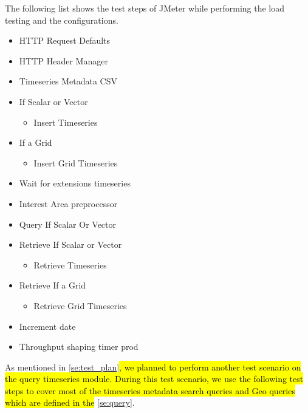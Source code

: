 The following list shows the test steps of  JMeter while performing the load testing and the configurations.

\begin{itemize}
    \item HTTP Request Defaults
    \item HTTP Header Manager
    \item Timeseries Metadata CSV
    \item If Scalar or Vector
        \begin{itemize}
            \item Insert Timeseries
        \end{itemize}
    \item If a Grid
    \begin{itemize}
        \item Insert Grid Timeseries
    \end{itemize}
    \item Wait for extensions timeseries
    \item Interest Area preprocessor
    \item Query If Scalar Or Vector
    \item Retrieve If Scalar or Vector
        \begin{itemize}
            \item Retrieve Timeseries
        \end{itemize}
    \item Retrieve If a Grid
    \begin{itemize}
        \item Retrieve Grid Timeseries
    \end{itemize}
    \item Increment date
    \item Throughput shaping timer prod
\end{itemize}

As mentioned in \cref{se:test_plan}\hl{, we planned to perform another test scenario on the query timeseries module. During this test scenario, we use the following test steps to cover most of the timeseries metadata search queries and Geo queries which are defined in the} \cref{se:query}.

